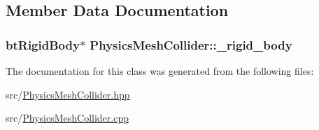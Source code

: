 \subsection{Member Data Documentation}
\subsubsection[{\texorpdfstring{\+\_\+rigid\+\_\+body}{_rigid_body}}]{\setlength{\rightskip}{0pt plus 5cm}bt\+Rigid\+Body$\ast$ Physics\+Mesh\+Collider\+::\+\_\+rigid\+\_\+body\hspace{0.3cm}{\ttfamily [private]}}\hypertarget{classPhysicsMeshCollider_a79bf728a386ac89b63c4ded82af6762b}{}\label{classPhysicsMeshCollider_a79bf728a386ac89b63c4ded82af6762b}


The documentation for this class was generated from the following files\+:\begin{DoxyCompactItemize}
\item 
src/\hyperlink{PhysicsMeshCollider_8hpp}{Physics\+Mesh\+Collider.\+hpp}\item 
src/\hyperlink{PhysicsMeshCollider_8cpp}{Physics\+Mesh\+Collider.\+cpp}\end{DoxyCompactItemize}
